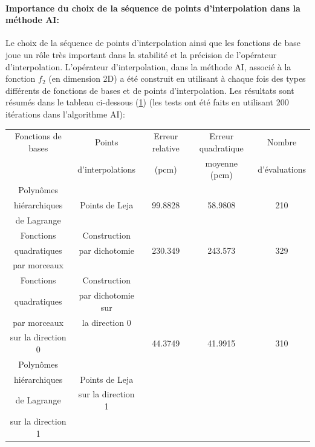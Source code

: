 \paragraph{Importance du choix de la séquence de points d'interpolation dans la méthode AI:\\}
\hspace{0.5cm} Le choix de la séquence de points d'interpolation ainsi que les fonctions de base joue un rôle très important dans la stabilité et la précision de l'opérateur d'interpolation. L'opérateur d'interpolation, dans la méthode AI, associé à la fonction $f_2$ (en dimension 2D) a été construit en utilisant à chaque fois des types différents de fonctions de bases et de points d'interpolation. Les résultats sont résumés dans le tableau ci-dessous (\ref{table:analytics}) (les tests ont été faits en utilisant 200 itérations dans l'algorithme AI):
\begin{center}
\begin{table}[!h]
\begin{tabular}{|*{5}{c|}}
	\hline
	Fonctions de bases 		& Points 			 									& Erreur relative	& Erreur quadratique 	& Nombre 		\\
												&	d'interpolations							&	 (pcm)					& moyenne (pcm)			 	& d'évaluations			\\
	\hline
	Polynômes  						&&&&\\
	hiérarchiques					& Points de Leja 		 						& 99.8828					& 58.9808 						& 210									\\
	de Lagrange						&&&&\\
	\hline
	Fonctions 						&	Construction			 						&&&\\
	quadratiques 					&	par dichotomie								&	230.349 				& 243.573							& 329 								\\
	par morceaux  				&   					   								&&&\\
	\hline
	Fonctions     				& Construction									&&&\\
	quadratiques					& par dichotomie sur 						&&&\\
	par morceaux					& la direction 0								&&&\\
	sur la direction 0		&																&	44.3749 				& 41.9915							& 310 								\\
	Polynômes     				&  															&&&\\
	hiérarchiques					& Points de Leja								&&&\\
	de Lagrange						& sur la direction 1						&&&\\
	sur la direction 1		&																&&&\\
	\hline
\end{tabular}
\label{table:analytics}
\end{table}
\end{center}
